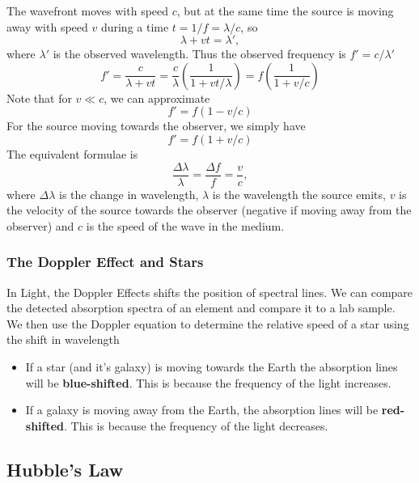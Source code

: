 The wavefront moves with speed $c$, but at the same time the source is moving away with speed $v$ during a time $t = 1/f = \lambda/c$, so
\begin{equation}
    \lambda + vt = \lambda',
\end{equation}
where $\lambda'$ is the observed wavelength. Thus the observed frequency is $f' = c/\lambda'$
\begin{equation}
    f' = \frac{c}{\lambda + vt} = \frac{c}{\lambda}\left(\frac{1}{1+vt/\lambda}\right) = f\left(\frac{1}{1+v/c}\right)
\end{equation}
Note that for $v \ll c$, we can approximate 
\begin{equation}
    f' = f (1-v/c)
\end{equation}
For the source moving towards the observer, we simply have
\begin{equation}
    f' = f (1+v/c)
\end{equation}
The equivalent formulae is
\begin{equation}
    \frac{\Delta \lambda}{\lambda} = \frac{\Delta f}{f} = \frac{v}{c},
\end{equation}
where $\Delta \lambda$ is the change in wavelength, $\lambda$ is the wavelength the source emits, $v$ is the velocity of the source towards the observer (negative if moving away from the observer) and $c$ is the speed of the wave in the medium.

\subsubsection{The Doppler Effect and Stars}

In Light, the Doppler Effects shifts the position of spectral lines. We can compare the detected absorption spectra of an element and compare it to a lab sample. We then use the Doppler equation to determine the relative speed of a star using the shift in wavelength

\begin{itemize}
    \item If a star (and it's galaxy) is moving towards the Earth the absorption lines will be \textbf{blue-shifted}. This is because the frequency of the light increases.
    \item If a galaxy is moving away from the Earth, the absorption lines will be \textbf{red-shifted}. This is because the frequency of the light decreases.
\end{itemize}

\subsection{Hubble's Law}

